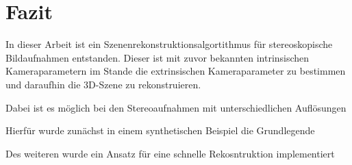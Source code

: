 \chapter{Fazit}



%
%
%
%
%
%
%


In dieser Arbeit ist ein Szenenrekonstruktionsalgortithmus für stereoskopische Bildaufnahmen entstanden. Dieser ist mit zuvor bekannten intrinsischen Kameraparametern im Stande die extrinsischen Kameraparameter zu bestimmen und daraufhin die 3D-Szene zu rekonstruieren. 

Dabei ist es möglich bei den Stereoaufnahmen mit unterschiedlichen Auflösungen 

Hierfür wurde zunächst in einem synthetischen Beispiel die Grundlegende




Des weiteren wurde ein Ansatz für eine schnelle Rekosntruktion implementiert